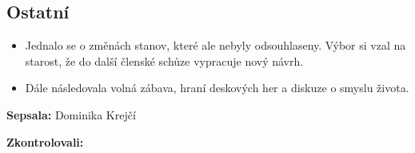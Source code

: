 \documentclass[11pt,a4paper]{article}
\begin{document}
\subsection*{Ostatní}
\begin{itemize}[itemsep=0pt]
\item Jednalo se o změnách stanov, které ale nebyly odsouhlaseny. Výbor si vzal na starost, že do další členské schůze vypracuje nový návrh.
\item Dále následovala volná zábava, hraní deskových her a diskuze o smyslu života.
\end{itemize}

\textbf{Sepsala:} Dominika Krejčí

\textbf{Zkontrolovali:}
\end{document}
